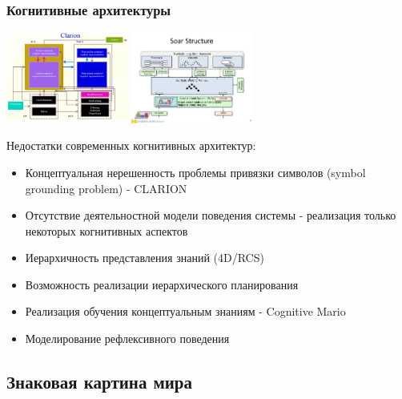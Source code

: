 \documentclass[default]{beamer}
\begin{document}
	\begin{frame}
		\frametitle{Когнитивные архитектуры}
		\begin{center}
			\includegraphics[width=0.3\textwidth]{clarion.jpg}
			\includegraphics[width=0.3\textwidth]{soar.jpg}
		\end{center}
		\scriptsize
		Недостатки современных когнитивных архитектур:
		\begin{itemize}
			\item Концептуальная нерешенность проблемы привязки символов (symbol grounding problem) - CLARION
			\item Отсутствие деятельностной модели поведения системы - реализация только некоторых когнитивных аспектов
			\item Иерархичность представления знаний (4D/RCS)
			\item Возможность реализации иерархического планирования
			\item Реализация обучения концептуальным знаниям - Cognitive Mario
			\item Моделирование рефлексивного поведения
		\end{itemize}
		\vspace{-5pt}
		\nocite{*}
		\printbibliography[keyword={symbgrnd}, resetnumbers=true]
	\end{frame}

	\subsection{Знаковая картина мира}
	
\end{document}
